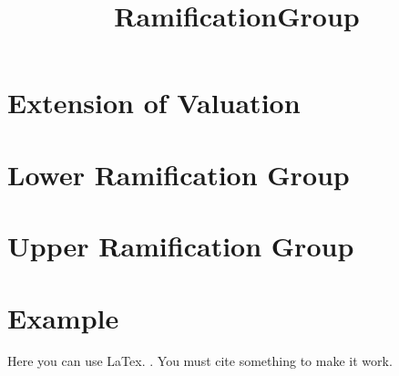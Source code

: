 \title{RamificationGroup}




\maketitle


\tableofcontents

\section{Extension of Valuation}

\section{Lower Ramification Group}

\begin{definition}

\end{definition}

\section{Upper Ramification Group}

\section{Example}
Here you can use LaTex. \cite{marcus}. You must cite something to make it work.


